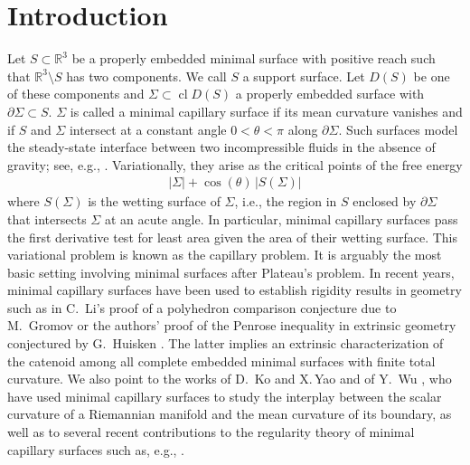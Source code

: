 \documentclass[11pt]{amsart}
\begin{document}
	\section{Introduction}
	Let $S\subset \mathbb{R}^3$ be a properly embedded minimal surface with positive reach  such that $\mathbb{R}^3\setminus S$ has  two components. We call $S$ a support surface. Let $D(S)$ be one of these components and $\Sigma \subset \operatorname{cl}D(S)$  a properly embedded surface with $\partial \Sigma\subset S$. $\Sigma$ is called a minimal capillary surface if its mean curvature  vanishes and if $S$ and $\Sigma$ intersect at a constant angle  $0<\theta<\pi$ along $\partial \Sigma$. Such surfaces model the steady-state interface between two incompressible fluids in the absence of gravity; see, e.g., \cite{Taylor}.   Variationally,  they arise as the critical points of the free energy
	\begin{align} \label{free energy}
	|\Sigma|+\cos(\theta)\,|S(\Sigma)|
	\end{align} 
	where $S(\Sigma)$ is the wetting surface of $\Sigma$, i.e., the region in $S$ enclosed by $\partial \Sigma$ that intersects $\Sigma$ at an acute angle. In particular, minimal capillary surfaces pass the first derivative test for least area given the area of their wetting surface. This variational problem is known as the capillary problem. It is arguably the most basic setting   involving minimal surfaces after Plateau's problem.  In recent years, minimal capillary surfaces have been used to establish rigidity results in geometry such as in C.~Li's proof \cite{Li} of a polyhedron comparison conjecture due to M.~Gromov \cite{Gromov} or the authors' proof \cite{eichmair2024penrose} of the Penrose inequality in extrinsic geometry conjectured by G.~Huisken \cite{volkmann}. The latter implies an extrinsic characterization of the catenoid among all complete embedded minimal surfaces with finite total curvature. We also point to the works of D.~Ko and X.\,Yao \cite{ko1,ko2} and of Y.~Wu \cite{Wu}, who have used minimal capillary surfaces to study the interplay between  the scalar curvature of a Riemannian manifold and the mean curvature of its  boundary, as well as to several recent contributions to the regularity theory of minimal capillary surfaces such as, e.g.,  \cite{DePhillipis,HongSaturnino,LiZhouZhu,dePhilippis2,chodoshedelenli,DeMasietal}.
	
\end{document}

